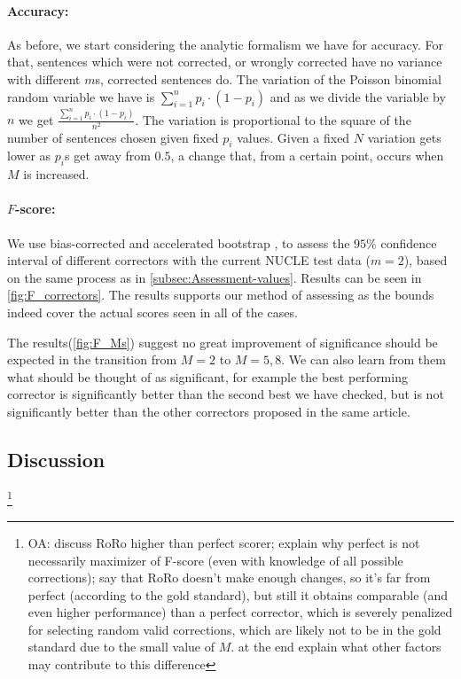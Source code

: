\documentclass[letter,11pt]{article}
\newcommand{\oa}[1]{\footnote{\color{red}OA: #1}}
\begin{document}
\paragraph{Accuracy:} As before, we start considering the analytic formalism we have for accuracy. For that, sentences which were not corrected, or wrongly corrected have no variance with different $m$s, corrected sentences do. The variation of the Poisson binomial random variable we have is $\sum_{i=1}^{n}p_i\cdot\left(1-p_i\right)$ and as we divide the variable by $n$ we get $\frac{\sum_{i=1}^{n}p_i\cdot\left(1-p_i\right)}{n^2}$. 
The variation is proportional to the square of the number of sentences chosen given fixed $p_i$ values. Given a fixed $N$ variation gets lower as $p_i$s get away from $0.5$, a change that, from a certain point, occurs when $M$ is increased.

\paragraph{$F$-score:} We use bias-corrected and accelerated bootstrap \cite{efron1987better}, to assess the $95\%$ confidence interval of different correctors with the current NUCLE test data ($m=2$), based on the same process as in \ref{subsec:Assessment-values}. Results can be seen in \ref{fig:F_correctors}. The results supports our method of assessing as the bounds indeed cover the actual scores seen in all of the cases.

The results(\ref{fig:F_Ms}) suggest no great improvement of significance should be expected in the transition from $M=2$ to $M=5,8$. We can also learn from them what should be thought of as significant, for example the best performing corrector is significantly better than the second best we have checked, but is not significantly better than the other correctors proposed in the same article\cite{rozovskaya2016grammatical}.

\subsection{Discussion}

\oa{discuss RoRo higher than perfect scorer; explain why perfect is not necessarily
  maximizer of F-score (even with knowledge of all possible corrections);
  say that RoRo doesn't make enough changes, so it's far from perfect (according
  to the gold standard), but still it obtains comparable (and even higher
  performance) than a perfect corrector, which is severely penalized for selecting
  random valid corrections, which are likely not to be in the gold standard
  due to the small value of $M$.
  at the end explain what other factors may contribute to this difference}
\end{document}
